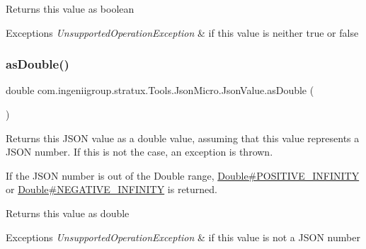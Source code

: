 \begin{DoxyReturn}{Returns}
this value as {\ttfamily boolean} 
\end{DoxyReturn}

\begin{DoxyExceptions}{Exceptions}
{\em Unsupported\+Operation\+Exception} & if this value is neither {\ttfamily true} or {\ttfamily false} \\
\hline
\end{DoxyExceptions}
\mbox{\label{classcom_1_1ingeniigroup_1_1stratux_1_1_tools_1_1_json_micro_1_1_json_value_a9907fd09f7d13a6fc574c81294672392}} 
\subsubsection{\texorpdfstring{as\+Double()}{asDouble()}}
{\footnotesize\ttfamily double com.\+ingeniigroup.\+stratux.\+Tools.\+Json\+Micro.\+Json\+Value.\+as\+Double (\begin{DoxyParamCaption}{ }\end{DoxyParamCaption})}

Returns this J\+S\+ON value as a {\ttfamily double} value, assuming that this value represents a J\+S\+ON number. If this is not the case, an exception is thrown. 

If the J\+S\+ON number is out of the {\ttfamily Double} range, \hyperlink{}{Double\#\+P\+O\+S\+I\+T\+I\+V\+E\+\_\+\+I\+N\+F\+I\+N\+I\+TY} or \hyperlink{}{Double\#\+N\+E\+G\+A\+T\+I\+V\+E\+\_\+\+I\+N\+F\+I\+N\+I\+TY} is returned. 

\begin{DoxyReturn}{Returns}
this value as {\ttfamily double} 
\end{DoxyReturn}

\begin{DoxyExceptions}{Exceptions}
{\em Unsupported\+Operation\+Exception} & if this value is not a J\+S\+ON number \\
\hline
\end{DoxyExceptions}
\mbox{\label{classcom_1_1ingeniigroup_1_1stratux_1_1_tools_1_1_json_micro_1_1_json_value_aee2015854b8f8323a4bd7f7f770fba0e}} 

